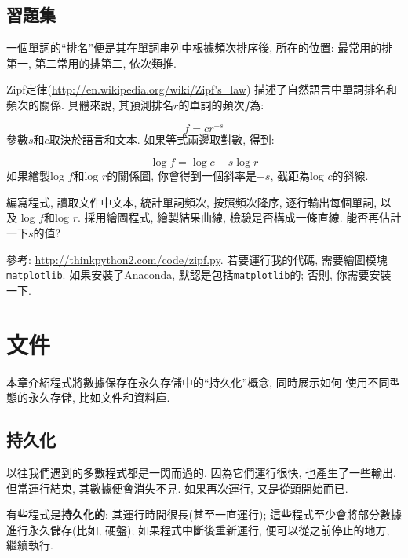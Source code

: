 \documentclass[10pt]{book}
\begin{document}
\section{習題集}

\begin{exercise}

一個單詞的``排名''便是其在單詞串列中根據頻次排序後, 所在的位置:
最常用的排第一, 第二常用的排第二, 依次類推. 

Zipf定律(\url{http://en.wikipedia.org/wiki/Zipf's_law})
描述了自然語言中單詞排名和頻次的關係. 
具體來說, 其預測排名$r$的單詞的頻次$f$為:

\[ f = c r^{-s} \]
%
參數$s$和$c$取決於語言和文本. 
如果等式兩邊取對數, 得到:

\[ \log f = \log c - s \log r \]
%
如果繪製log $f$和log $r$的關係圖, 你會得到一個斜率是$-s$, 截距為log $c$的斜線. 

編寫程式, 讀取文件中文本, 
統計單詞頻次, 按照頻次降序, 逐行輸出每個單詞, 以及
log $f$和log $r$. 
採用繪圖程式, 繪製結果曲線, 檢驗是否構成一條直線. 
能否再估計一下$s$的值?

參考: \url{http://thinkpython2.com/code/zipf.py}.
若要運行我的代碼, 需要繪圖模塊{\tt matplotlib}.
如果安裝了Anaconda, 默認是包括{\tt matplotlib}的;
否則, 你需要安裝一下. 

\end{exercise}



\chapter{文件}

本章介紹程式將數據保存在永久存儲中的``持久化''概念, 同時展示如何
使用不同型態的永久存儲, 比如文件和資料庫. 


\section{持久化}

以往我們遇到的多數程式都是一閃而過的, 因為它們運行很快, 也產生了一些輸出, 
但當運行結束, 其數據便會消失不見. 
如果再次運行, 又是從頭開始而已. 

有些程式是{\bf 持久化的}: 其運行時間很長(甚至一直運行);
這些程式至少會將部分數據進行永久儲存(比如, 硬盤);
如果程式中斷後重新運行, 便可以從之前停止的地方, 繼續執行. 
\end{document}
